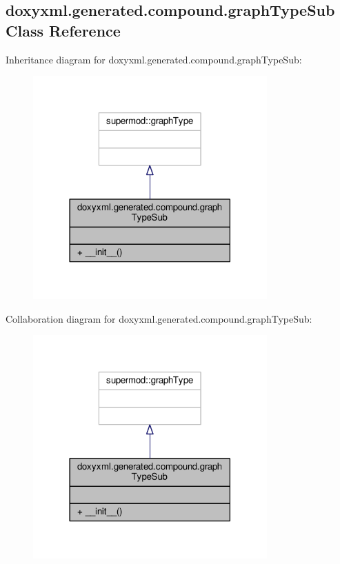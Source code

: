 \subsection{doxyxml.\+generated.\+compound.\+graph\+Type\+Sub Class Reference}
\label{classdoxyxml_1_1generated_1_1compound_1_1graphTypeSub}


Inheritance diagram for doxyxml.\+generated.\+compound.\+graph\+Type\+Sub\+:
\nopagebreak
\begin{figure}[H]
\begin{center}
\leavevmode
\includegraphics[width=254pt]{db/d65/classdoxyxml_1_1generated_1_1compound_1_1graphTypeSub__inherit__graph}
\end{center}
\end{figure}


Collaboration diagram for doxyxml.\+generated.\+compound.\+graph\+Type\+Sub\+:
\nopagebreak
\begin{figure}[H]
\begin{center}
\leavevmode
\includegraphics[width=254pt]{dc/d55/classdoxyxml_1_1generated_1_1compound_1_1graphTypeSub__coll__graph}
\end{center}
\end{figure}
